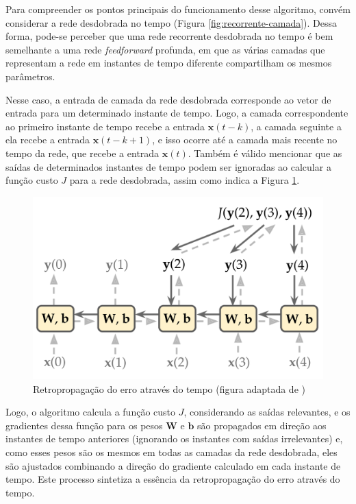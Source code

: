 \documentclass[a4paper, 12pt]{article}
\begin{document}
Para compreender os pontos principais do funcionamento desse algoritmo, convém considerar a rede desdobrada no tempo (Figura \ref{fig:recorrente-camada}). Dessa forma, pode-se perceber que uma rede recorrente desdobrada no tempo é bem semelhante a uma rede \textit{feedforward} profunda, em que as várias camadas que representam a rede em instantes de tempo diferente compartilham os mesmos parâmetros.

Nesse caso, a entrada de camada da rede desdobrada corresponde ao vetor de entrada para um determinado instante de tempo. Logo, a camada correspondente ao primeiro instante de tempo recebe a entrada $\mathbf{x}(t-k)$, a camada seguinte a ela recebe a entrada $\mathbf{x}(t-k+1)$, e isso ocorre até a camada mais recente no tempo da rede, que recebe a entrada $\mathbf{x}(t)$. Também é válido mencionar que as saídas de determinados instantes de tempo podem ser ignoradas ao calcular a função custo $J$ para a rede desdobrada, assim como indica a Figura \ref{fig:rnn-backpropagation}.
\begin{figure}[!ht]
\centering
\includegraphics[scale = 0.3]{rnn-backpropagation.pdf}
\caption{Retropropagação do erro através do tempo (figura adaptada de \cite{geron2019hands})}
\label{fig:rnn-backpropagation}
\end{figure}

Logo, o algoritmo calcula a função custo $J$, considerando as saídas relevantes, e os gradientes dessa função para os pesos $\mathbf{W}$ e $\mathbf{b}$ são propagados em direção aos instantes de tempo anteriores (ignorando os instantes com saídas irrelevantes) e, como esses pesos são os mesmos em todas as camadas da rede desdobrada, eles são ajustados combinando a direção do gradiente calculado em cada instante de tempo. Este processo sintetiza a essência da retropropagação do erro através do tempo.
\end{document}
